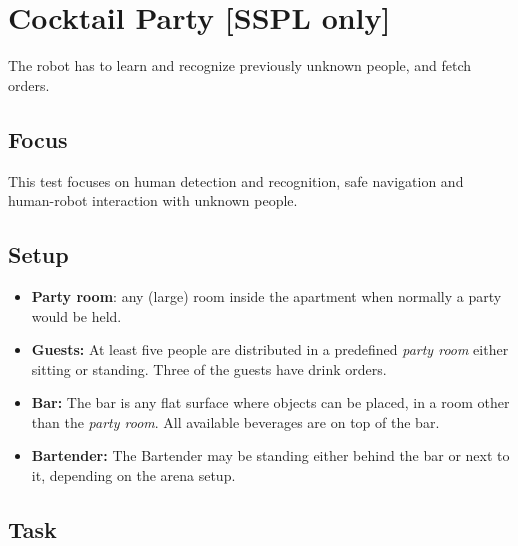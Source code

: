 \section{Cocktail Party [SSPL only]}

The robot has to learn and recognize previously unknown people, and fetch orders.

\subsection{Focus}

This test focuses on human detection and recognition, safe navigation and human-robot interaction with unknown people.

\subsection{Setup}
\begin{itemize}
	\item \textbf{Party room}: any (large) room inside the apartment when normally a party would be held.
	\item \textbf{Guests:} At least five people are distributed in a predefined \textit{party room} either sitting or standing.
                Three of the guests have drink orders.
	\item \textbf{Bar:} The bar is any flat surface where objects can be placed, in a room other than the \textit{party room}.
                All available beverages are on top of the bar.
	\item \textbf{Bartender:} The Bartender may be standing either behind the bar or next to it, depending on the arena setup.
\end{itemize}

\subsection{Task}

